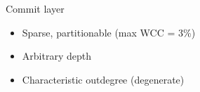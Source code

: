 \documentclass[aspectratio=169,xcolor=table]{beamer}
\begin{document}
\begin{frame}
\begin{columns}
            \begin{block}{Commit layer}
                \begin{itemize}
                    \item Sparse, partitionable (max WCC = 3\%)
                    \item Arbitrary depth
                    \item Characteristic outdegree (degenerate)
                \end{itemize}
                \begin{center}
                    \scalebox{0.5}{}
                \end{center}
            \end{block}
        \end{columns}
    \end{frame}
\end{document}
